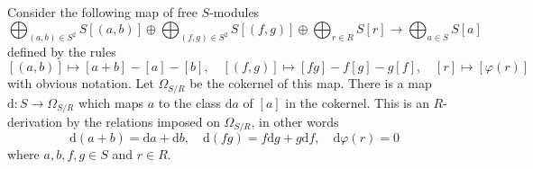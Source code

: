 
\medskip\noindent
Consider the following map of free $S$-modules
$$
\bigoplus\nolimits_{(a, b)\in S^2} S[(a, b)] \oplus
\bigoplus\nolimits_{(f, g)\in S^2} S[(f, g)] \oplus
\bigoplus\nolimits_{r\in R} S[r]
\longrightarrow
\bigoplus\nolimits_{a\in S} S[a]
$$
defined by the rules
$$
[(a, b)] \longmapsto [a + b] - [a] - [b],\quad
[(f, g)] \longmapsto [fg] -f[g] - g[f],\quad
[r]      \longmapsto [\varphi(r)]
$$
with obvious notation. Let $\Omega_{S/R}$ be the cokernel of this map.
There is a map $\text{d} : S \to \Omega_{S/R}$ which maps $a$ to the
class $\text{d}a$ of $[a]$ in the cokernel. This is an $R$-derivation
by the relations imposed on $\Omega_{S/R}$, in other words
$$
\text{d}(a + b) = \text{d}a + \text{d}b, \quad
\text{d}(fg) = f\text{d}g + g\text{d}f, \quad
\text{d}\varphi(r) = 0
$$
where $a,b,f,g \in S$ and $r \in R$.
